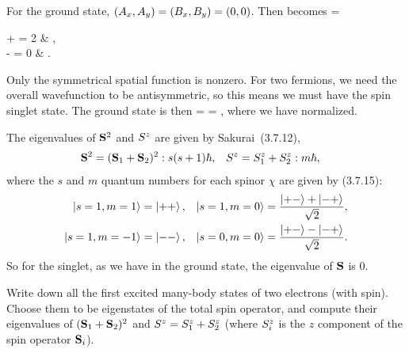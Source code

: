 \begin{solution}
	For the ground state, $(A_x, A_y) = (B_x, B_y) = (0, 0)$.  Then  becomes
	\beq
		\kphi =  \begin{cases}
			\ket{0 0}  +   = 2   & , \\
			\ket{0 0}  -   = 0 & .
		\end{cases}
	\eeq
	Only the symmetrical spatial function is nonzero.  For two fermions, we need the overall wavefunction to be antisymmetric, so this means we must have the spin singlet state.  The ground state is then
	\beq
		\kpsi = \ket{\nxq, \nxw} \ket{\nxq, \nyq} \ket{\sq, \sw}
		= ,
	\eeq
	where we have normalized.
	
	The eigenvalues of $\vb{S}^2$ and $S^z$ are given by Sakurai~(3.7.12),
	\begin{align} \label{eigen}
		\vb{S}^2 = (\vb{S}_1 + \vb{S}_2)^2 &: s(s + 1) \hbar, &
		S^z = S^z_1 + S^z_2 &: m \hbar,
	\end{align}
	where the $s$ and $m$ quantum numbers for each spinor $\chi$ are given by (3.7.15):
	\begin{align}
		\ket{s=1, m=1} &= \ket{+ +}, &
		\ket{s=1, m=0} &= \frac{\ket{+ -} + \ket{- +}}{\sqrt{2}}, \notag \\
		\ket{s=1, m=-1} &= \ket{- -}, &
		\ket{s=0, m=0} &= \frac{\ket{+ -} - \ket{- +}}{\sqrt{2}}. \label{sm}
	\end{align}
	So for the singlet, as we have in the ground state, the eigenvalue of $\vb{S}$ is 0.
\end{solution}


\newcommand{\fq}{f_1}
\newcommand{\gq}{g_1}

\begin{problem}
	Write down all the first excited many-body states of two electrons (with spin).  Choose them to be eigenstates of the total spin operator, and compute their eigenvalues of $(\vb{S}_1 + \vb{S}_2)^2$ and $S^z = S^z_1 + S^z_2$ (where $S^z_i$ is the $z$ component of the spin operator $\vb{S}_i$).
\end{problem}

